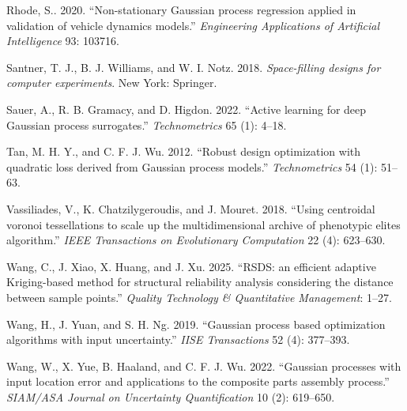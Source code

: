 \documentclass[]{interact}
\theoremstyle{plain}%
\theoremstyle{definition}
\theoremstyle{remark}
\begin{document}
\begin{thebibliography}{}
Rhode, S.. 2020. ``Non-stationary Gaussian process regression applied in validation of vehicle dynamics models.'' \emph{Engineering Applications of Artificial Intelligence} 93: 103716.

Santner, T. J., B. J. Williams, and W. I. Notz. 2018. \emph{Space-filling designs for computer experiments}. New York: Springer.

Sauer, A., R. B. Gramacy, and D. Higdon. 2022. ``Active learning for deep Gaussian process surrogates.'' \emph{Technometrics} 65 (1): 4--18.

Tan, M. H. Y., and C. F. J. Wu. 2012. ``Robust design optimization with quadratic loss derived from Gaussian process models.'' \emph{Technometrics} 54 (1): 51--63.

Vassiliades, V., K. Chatzilygeroudis, and J. Mouret. 2018. ``Using centroidal voronoi tessellations to scale up the multidimensional archive of phenotypic elites algorithm.'' \emph{IEEE Transactions on Evolutionary Computation} 22 (4): 623--630.

Wang, C., J. Xiao, X. Huang, and J. Xu. 2025. ``RSDS: an efficient adaptive Kriging-based method for structural reliability analysis considering the distance between sample points.'' \emph{Quality Technology \& Quantitative Management}: 1--27.



Wang, H., J. Yuan, and S. H. Ng. 2019. ``Gaussian process based optimization algorithms with input uncertainty.'' \emph{IISE Transactions} 52 (4): 377--393.

Wang, W., X. Yue, B. Haaland, and C. F. J. Wu. 2022. ``Gaussian processes with input location error and applications to the composite parts assembly process.'' \emph{SIAM/ASA Journal on Uncertainty Quantification} 10 (2): 619--650.



\end{thebibliography}
\end{document}
